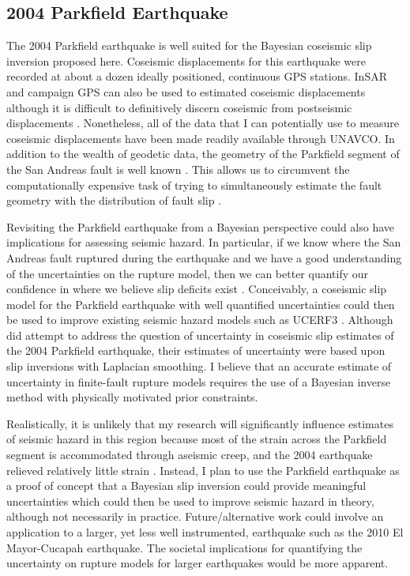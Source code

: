 \documentclass[12pt]{article}
\begin{document}
\subsection*{2004 Parkfield Earthquake}
The 2004 Parkfield earthquake is well suited for the Bayesian coseismic slip inversion proposed here.  Coseismic displacements for this earthquake were recorded at about a dozen ideally positioned, continuous GPS stations. InSAR and campaign GPS can also be used to estimated coseismic displacements although it is difficult to definitively discern coseismic from postseismic displacements \citep{Johanson2006}. Nonetheless, all of the data that I can potentially use to measure coseismic displacements have been made readily available through UNAVCO.  In addition to the wealth of geodetic data, the geometry of the Parkfield segment of the San Andreas fault is well known \citep{Simpson2006}.  This allows us to circumvent the computationally expensive task of trying to simultaneously estimate the fault geometry with the distribution of fault slip \citep[e.g.][]{Fukuda2008}. 

Revisiting the Parkfield earthquake from a Bayesian perspective could also have implications for assessing seismic hazard.  In particular, if we know where the San Andreas fault ruptured during the earthquake and we have a good understanding of the uncertainties on the rupture model, then we can better quantify our confidence in where we believe slip deficits exist \citep{Murray2006}.  Conceivably, a coseismic slip model for the Parkfield earthquake with well quantified uncertainties could then be used to improve existing seismic hazard models such as UCERF3 \citep{Field2014}.  Although \citet{Page2009} did attempt to address the question of uncertainty in coseismic slip estimates of the 2004 Parkfield earthquake, their estimates of uncertainty were based upon slip inversions with Laplacian smoothing.  I believe that an accurate estimate of uncertainty in finite-fault rupture models requires the use of a Bayesian inverse method with physically motivated prior constraints.  

Realistically, it is unlikely that my research will significantly influence estimates of seismic hazard in this region because most of the strain across the Parkfield segment is accommodated through aseismic creep, and the 2004 earthquake relieved relatively little strain \citep{Murray2006}.  Instead, I plan to use the Parkfield earthquake as a proof of concept that a Bayesian slip inversion could provide meaningful uncertainties which could then be used to improve seismic hazard in theory, although not necessarily in practice.  Future/alternative work could involve an application to a larger, yet less well instrumented, earthquake such as the 2010 El Mayor-Cucapah earthquake.  The societal implications for quantifying the uncertainty on rupture models for larger earthquakes would be more apparent.
\end{document}
